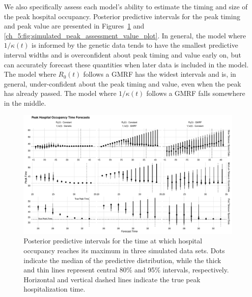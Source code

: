 We also specifically assess each model's ability to estimate the timing and size of the peak hospital occupancy.
Posterior predictive intervals for the peak timing and peak value are presented in Figures~\ref{ch_5:fig:simulated_peak_assessment_time_plot} and \ref{ch_5:fig:simulated_peak_assessment_value_plot}.
In general, the model where \( 1 / \kappa(t) \) is informed by the genetic data tends to have the smallest predictive interval widths and is overconfident about peak timing and value early on, but can accurately forecast these quantities when later data is included in the model.
The model where \( R_0(t) \) follows a GMRF has the widest intervals and is, in general, under-confident about the peak timing and value, even when the peak has already passed.
The model where \( 1 / \kappa(t) \) follows a GMRF falls somewhere in the middle.

\begin{figure}
    \centering
    \includegraphics[width=1.0\columnwidth]{simulated_peak_assessment_time_plot}
    \caption[Posterior predictive intervals for peak hospital occupancy timing for simulated data sets.]{Posterior predictive intervals for the time at which hospital occupancy reaches its maximum in three simulated data sets.
    Dots indicate the median of the predictive distribution, while the thick and thin lines represent central 80\% and 95\% intervals, respectively.
    Horizontal and vertical dashed lines indicate the true peak hospitalization time.}
    \label{ch_5:fig:simulated_peak_assessment_time_plot}
\end{figure}


